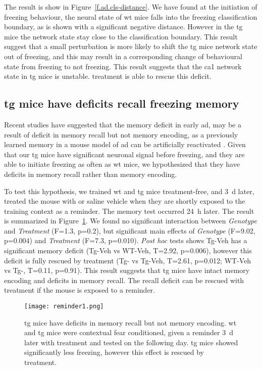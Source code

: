 The result is show in Figure~\ref{f.ad.cls-distance}. We have found at the initiation of freezing behaviour, the neural state of \gls{wt} mice falls into the freezing classification boundary, as is shown with a significant negative distance. However in the \gls{tg} mice the network state stay close to the classification boundary. This result suggest that a small perturbation is more likely to shift the \gls{tg} mice network state out of freezing, and this may result in a corresponding change of behavioural state from freezing to not freezing. This result suggests that the \gls{ca1} network state in \gls{tg} mice is unstable. \tglu{} treatment is able to rescue this deficit. 

\subsection{\Gls{tg} mice have deficits recall freezing memory}

Recent studies have suggested that the memory deficit in early \gls{ad}, may be a result of deficit in memory recall but not memory encoding, as a previously learned memory in a mouse model of \gls{ad} can be artificially reactivated \citep{roy16}. Given that our \gls{tg} mice have significant neuronal signal before freezing, and they are able to initiate freezing as often as \gls{wt} mice, we hypothesized that they have deficits in memory recall rather than memory encoding. 

To test this hypothesis, we trained \gls{wt} and \gls{tg} mice treatment-free, and \SI{3}{\day} later, treated the mouse with \tglu{} or saline vehicle when they are shortly exposed to the training context as a reminder. The memory test occurred \SI{24}{\hour} later. The result is summarized in Figure~\ref{f.ad.reminder1}. We found no significant interaction between \textit{Genotype} and \textit{Treatment} (F=1.3, p=0.2), but significant main effects of \textit{Genotype} (F=9.02, p=0.004) and \textit{Treatment} (F=7.3, p=0.010). \textit{Post hoc} tests shows Tg-Veh has a significant memory deficit (Tg-Veh vs WT-Veh, T=2.92, p=0.006), however this deficit is fully rescued by \tglu{} treatment (Tg-\glu{} vs Tg-Veh, T=2.61, p=0.012; WT-Veh vs Tg-\glu{}, T=0.11, p=0.91). This result suggests that \gls{tg} mice have intact memory encoding and deficits in memory recall. The recall deficit can be rescued with \tglu{} treatment if the mouse is exposed to a reminder.

\begin{figure}[h]
    \texttt{[image: reminder1.png]}
    \caption[\tglu{} treatment during a brief reminder rescues memory recall deficit.]{\gls{tg} mice have deficits in memory recall but not memory encoding. \gls{wt} and \gls{tg} mice were contextual fear conditioned, given a reminder \SI{3}{\day} later with treatment and tested on the following day. \gls{tg} mice showed significantly less freezing, however this effect is rescued by \tglu{} treatment. \label{f.ad.reminder1}}
\end{figure}

